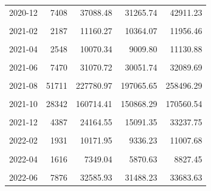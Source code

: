 \begin{longtable}[t]{crrrr}
2020-12 & 7408 & 37088.48 & 31265.74 & 42911.23\\
\cellcolor{gray!10}{2021-01} & \cellcolor{gray!10}{2237} & \cellcolor{gray!10}{12536.31} & \cellcolor{gray!10}{9323.42} & \cellcolor{gray!10}{15749.20}\\
2021-02 & 2187 & 11160.27 & 10364.07 & 11956.46\\
\cellcolor{gray!10}{2021-03} & \cellcolor{gray!10}{2501} & \cellcolor{gray!10}{10468.18} & \cellcolor{gray!10}{9295.00} & \cellcolor{gray!10}{11641.36}\\
2021-04 & 2548 & 10070.34 & 9009.80 & 11130.88\\
\cellcolor{gray!10}{2021-05} & \cellcolor{gray!10}{5288} & \cellcolor{gray!10}{20519.55} & \cellcolor{gray!10}{19086.12} & \cellcolor{gray!10}{21952.98}\\
2021-06 & 7470 & 31070.72 & 30051.74 & 32089.69\\
\cellcolor{gray!10}{2021-07} & \cellcolor{gray!10}{15985} & \cellcolor{gray!10}{60186.31} & \cellcolor{gray!10}{50411.32} & \cellcolor{gray!10}{69961.29}\\
2021-08 & 51711 & 227780.97 & 197065.65 & 258496.29\\
\cellcolor{gray!10}{2021-09} & \cellcolor{gray!10}{49829} & \cellcolor{gray!10}{254314.91} & \cellcolor{gray!10}{240832.13} & \cellcolor{gray!10}{267797.69}\\
2021-10 & 28342 & 160714.41 & 150868.29 & 170560.54\\
\cellcolor{gray!10}{2021-11} & \cellcolor{gray!10}{11596} & \cellcolor{gray!10}{57448.62} & \cellcolor{gray!10}{40549.80} & \cellcolor{gray!10}{74347.45}\\
2021-12 & 4387 & 24164.55 & 15091.35 & 33237.75\\
\cellcolor{gray!10}{2022-01} & \cellcolor{gray!10}{2759} & \cellcolor{gray!10}{14984.68} & \cellcolor{gray!10}{12450.66} & \cellcolor{gray!10}{17518.69}\\
2022-02 & 1931 & 10171.95 & 9336.23 & 11007.68\\
\cellcolor{gray!10}{2022-03} & \cellcolor{gray!10}{1790} & \cellcolor{gray!10}{8084.02} & \cellcolor{gray!10}{6557.69} & \cellcolor{gray!10}{9610.35}\\
2022-04 & 1616 & 7349.04 & 5870.63 & 8827.45\\
\cellcolor{gray!10}{2022-05} & \cellcolor{gray!10}{6698} & \cellcolor{gray!10}{25276.88} & \cellcolor{gray!10}{22965.34} & \cellcolor{gray!10}{27588.41}\\
2022-06 & 7876 & 32585.93 & 31488.23 & 33683.63\\

\end{longtable}
